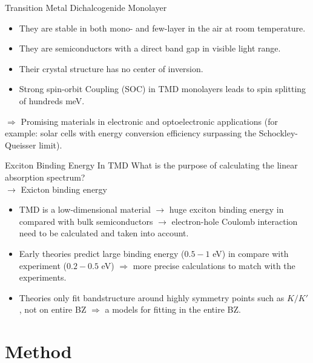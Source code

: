 \documentclass{beamer}
\begin{document}
	\begin{frame}{Transition Metal Dichalcogenide Monolayer}
		\begin{itemize}
			\item They are stable in both mono- and few-layer in the air at room temperature. \\
			\item They are semiconductors with a direct band gap in visible light range.
			\item Their crystal structure has no center of inversion.\\
			\item Strong spin-orbit Coupling (SOC) in TMD monolayers leads to spin splitting of hundreds meV.
		\end{itemize}
		$\Rightarrow$ Promising materials in electronic and optoelectronic applications (for example: solar cells with energy conversion efficiency surpassing the Schockley-Queisser limit).
	\end{frame}
	\begin{frame}{Exciton Binding Energy In TMD}
		What is the purpose of calculating the linear absorption spectrum?\\ $\to$ Exicton binding energy
		\begin{itemize}
			\item TMD is a low-dimensional material $\to$ huge exciton binding energy in compared with bulk semiconductors $\to$ electron-hole Coulomb interaction need to be calculated and taken into account.
			\item Early theories predict large binding energy ($0.5-1$ eV) in compare with experiment ($0.2-0.5$ eV) $\Rightarrow$ more precise calculations to match with the experiments.
			\item Theories only fit bandstructure around highly symmetry points such as $K/K'$, not on entire BZ $\Rightarrow$ a models for fitting in the entire BZ.
		\end{itemize}
	\end{frame}
	\section{Method}
\end{document}
